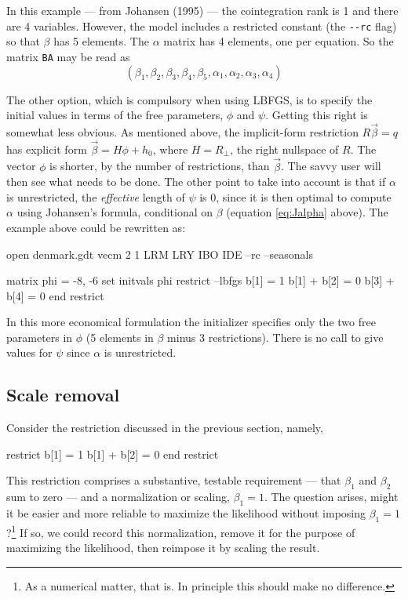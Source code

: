 In this example --- from Johansen (1995) --- the cointegration rank is
1 and there are 4 variables.  However, the model includes a restricted
constant (the \verb|--rc| flag) so that $\beta$ has 5 elements.  The
$\alpha$ matrix has 4 elements, one per equation.  So the matrix
\texttt{BA} may be read as
\[
\left(\beta_1, \beta_2, \beta_3, \beta_4, \beta_5,
 \alpha_1, \alpha_2, \alpha_3, \alpha_4 \right)
\]

The other option, which is compulsory when using LBFGS, is to specify
the initial values in terms of the free parameters, $\phi$ and $\psi$.
Getting this right is somewhat less obvious.  As mentioned above, the
implicit-form restriction $R\vec{\beta} = q$ has explicit form
$\vec{\beta} = H\phi + h_0$, where $H = R_{\perp}$, the right
nullspace of $R$.  The vector $\phi$ is shorter, by the number of
restrictions, than $\vec{\beta}$.  The savvy user will then see what
needs to be done.  The other point to take into account is that if
$\alpha$ is unrestricted, the \textit{effective} length of $\psi$ is
0, since it is then optimal to compute $\alpha$ using Johansen's
formula, conditional on $\beta$ (equation \ref{eq:Jalpha} above).  The
example above could be rewritten as:
\begin{code}
open denmark.gdt
vecm 2 1 LRM LRY IBO IDE --rc --seasonals

matrix phi = {-8, -6}
set initvals phi
restrict --lbfgs
  b[1] = 1
  b[1] + b[2] = 0
  b[3] + b[4] = 0
end restrict
\end{code}

In this more economical formulation the initializer specifies only the
two free parameters in $\phi$ (5 elements in $\beta$ minus 3
restrictions).  There is no call to give values for $\psi$ since
$\alpha$ is unrestricted.

\subsection{Scale removal}
\label{sec:vecm-scale-removal}

Consider the restriction discussed in the previous section, namely,
%
\begin{code}
restrict
  b[1] = 1
  b[1] + b[2] = 0
end restrict
\end{code}

This restriction comprises a substantive, testable requirement ---
that $\beta_1$ and $\beta_2$ sum to zero --- and a normalization or
scaling, $\beta_1 = 1$.  The question arises, might it be easier and
more reliable to maximize the likelihood without imposing $\beta_1 =
1$?\footnote{As a numerical matter, that is.  In principle this should
  make no difference.}  If so, we could record this normalization,
remove it for the purpose of maximizing the likelihood, then reimpose
it by scaling the result.

